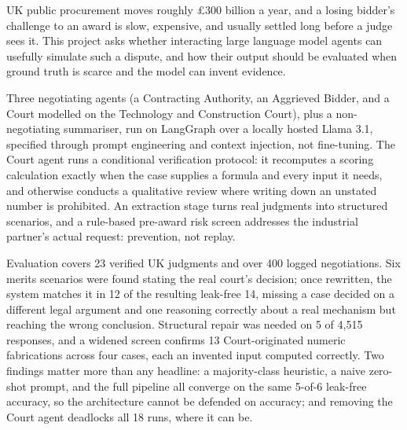 {
UK public procurement moves roughly \pounds300 billion a year, and a losing
bidder's challenge to an award is slow, expensive, and usually settled
long before a judge sees it. This project asks whether interacting large
language model agents can usefully simulate such a dispute, and how their
output should be evaluated when ground truth is scarce and the model can
invent evidence.

Three negotiating agents (a Contracting Authority, an Aggrieved Bidder, and
a Court modelled on the Technology and Construction Court), plus a
non-negotiating summariser, run on LangGraph over a locally hosted Llama
3.1, specified through prompt engineering and context injection, not
fine-tuning. The Court agent runs a conditional verification
protocol: it recomputes a scoring calculation exactly when the case
supplies a formula and every input it needs, and otherwise conducts a
qualitative review where writing down an unstated number is prohibited.
An extraction stage turns real judgments into structured scenarios, and a
rule-based pre-award risk screen addresses the industrial partner's actual
request: prevention, not replay.

Evaluation covers 23 verified UK judgments and over 400 logged
negotiations. Six merits scenarios were found stating the real court's
decision; once rewritten, the system matches it in 12 of the resulting
leak-free 14, missing a case decided on a different legal argument and one
reasoning correctly about a real mechanism but reaching the wrong
conclusion. Structural repair was needed on 5 of 4,515 responses, and a
widened screen confirms 13 Court-originated numeric fabrications across
four cases, each an invented input computed correctly. Two findings matter
more than any headline: a majority-class heuristic, a naive zero-shot
prompt, and the full pipeline all converge on the same 5-of-6 leak-free
accuracy, so the architecture cannot be defended on accuracy; and removing
the Court agent deadlocks all 18 runs, where it can be.
}

